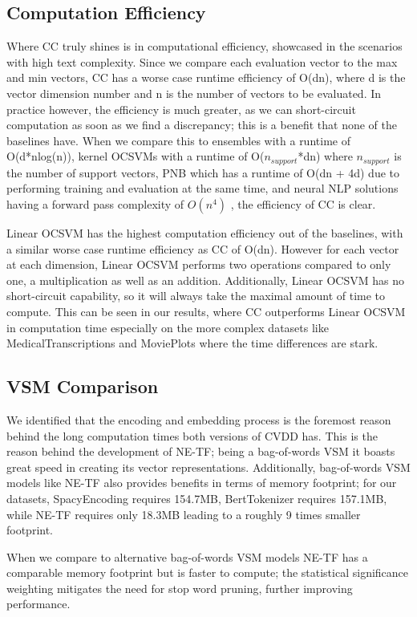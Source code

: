 \documentclass[11pt]{article}
\begin{document}
\subsection{Computation Efficiency}
Where CC truly shines is in computational efficiency, showcased in the scenarios with high text complexity. Since we compare each evaluation vector to the max and min vectors, CC has a worse case runtime efficiency of O(dn), where d is the vector dimension number and n is the number of vectors to be evaluated. In practice however, the efficiency is much greater, as we can short-circuit computation as soon as we find a discrepancy; this is a benefit that none of the baselines have. When we compare this to ensembles with a runtime of O(d*nlog(n)), kernel OCSVMs with a runtime of O($n_{support}$*dn) where $n_{support}$ is the number of support vectors, PNB which has a runtime of O(dn + 4d) due to performing training and evaluation at the same time, and neural NLP solutions having a forward pass complexity of $O(n^4)$ \cite{fredenslund2018computational}, the efficiency of CC is clear.

Linear OCSVM has the highest computation efficiency out of the baselines, with a similar worse case runtime efficiency as CC of O(dn). However for each vector at each dimension, Linear OCSVM performs two operations compared to only one, a multiplication as well as an addition. Additionally, Linear OCSVM has no short-circuit capability, so it will always take the maximal amount of time to compute. This can be seen in our results, where CC outperforms Linear OCSVM in computation time especially on the more complex datasets like MedicalTranscriptions and MoviePlots where the time differences are stark.

\subsection{VSM Comparison}
We identified that the encoding and embedding process is the foremost reason behind the long computation times both versions of CVDD has. This is the reason behind the development of NE-TF; being a bag-of-words VSM it boasts great speed in creating its vector representations. Additionally, bag-of-words VSM models like NE-TF also provides benefits in terms of memory footprint; for our datasets, SpacyEncoding requires 154.7MB, BertTokenizer requires 157.1MB, while NE-TF requires only 18.3MB leading to a roughly 9 times smaller footprint. 

When we compare to alternative bag-of-words VSM models NE-TF has a comparable memory footprint but is faster to compute; the statistical significance weighting mitigates the need for stop word pruning, further improving performance.
\end{document}
